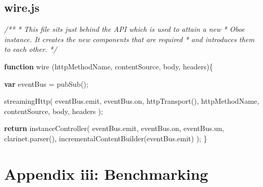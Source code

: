 \documentclass[12pt, ]{article}
\let\stdsection\section
\renewcommand\section{\newpage\stdsection}
\newenvironment{Shaded}{}{}
\newcommand{\KeywordTok}[1]{\textcolor[rgb]{0.00,0.44,0.13}{\textbf{{#1}}}}
\newcommand{\CommentTok}[1]{\textcolor[rgb]{0.38,0.63,0.69}{\textit{{#1}}}}
\newcommand{\OtherTok}[1]{\textcolor[rgb]{0.00,0.44,0.13}{{#1}}}
\newcommand{\FunctionTok}[1]{\textcolor[rgb]{0.02,0.16,0.49}{{#1}}}
\newcommand{\NormalTok}[1]{{#1}}
\begin{document}
\pagebreak

\subsection{wire.js}\label{headerux5fwire}

\label{src_wire}

\begin{Shaded}
\begin{Highlighting}[]
\CommentTok{/**}
\CommentTok{ * This file sits just behind the API which is used to attain a new}
\CommentTok{ * Oboe instance. It creates the new components that are required}
\CommentTok{ * and introduces them to each other.}
\CommentTok{ */}

\KeywordTok{function} \FunctionTok{wire} \NormalTok{(httpMethodName, contentSource, body, headers)\{}

   \KeywordTok{var} \NormalTok{eventBus = }\FunctionTok{pubSub}\NormalTok{();}
               
   \FunctionTok{streamingHttp}\NormalTok{( }\OtherTok{eventBus}\NormalTok{.}\FunctionTok{emit}\NormalTok{, }\OtherTok{eventBus}\NormalTok{.}\FunctionTok{on}\NormalTok{,}
                  \FunctionTok{httpTransport}\NormalTok{(), }
                  \NormalTok{httpMethodName, contentSource, body, headers );                              }
     
   \KeywordTok{return} \FunctionTok{instanceController}\NormalTok{( }
               \OtherTok{eventBus}\NormalTok{.}\FunctionTok{emit}\NormalTok{, }\OtherTok{eventBus}\NormalTok{.}\FunctionTok{on}\NormalTok{, }\OtherTok{eventBus}\NormalTok{.}\FunctionTok{un}\NormalTok{, }
               \OtherTok{clarinet}\NormalTok{.}\FunctionTok{parser}\NormalTok{(), }
               \FunctionTok{incrementalContentBuilder}\NormalTok{(}\OtherTok{eventBus}\NormalTok{.}\FunctionTok{emit}\NormalTok{) }
   \NormalTok{);}
\NormalTok{\}}
\end{Highlighting}
\end{Shaded}

\section{Appendix iii: Benchmarking}\label{appendix-iii-benchmarking}

\end{document}
